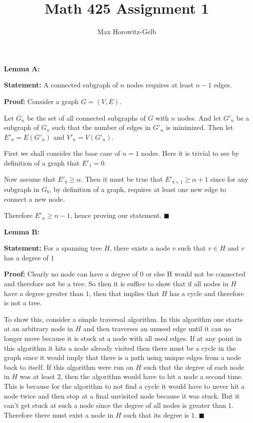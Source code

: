 \documentclass{article}
\title{Math 425 Assignment 1}
\author{Max Horowitz-Gelb}
\date{}
\newcommand*{\QEDA}{\hfill\ensuremath{\blacksquare}}%
\begin{document}
\maketitle
\section{}
\section{}
\textbf{Lemma A:}

\textbf{Statement:} A connected subgraph of $n$ nodes requires at least $n-1$ edges.

\textbf{Proof:} Consider a graph $G = (V,E)$. 

Let $G_n$ be the set of all connected subgraphs of $G$ with $n$ nodes. And let $G'_n$ be a subgraph of $G_n$ such that the number of edges in $G'_n$ is minimized. Then let $E'_n = E(G'_n)$ and $V'_n = V(G'_n)$.

First we shall consider the base case of $n = 1$ nodes. Here it is trivial to see by definition of a graph that $E'_1 = 0$. 

Now assume that $E'_b \geq \alpha$. Then it must be true that $E'_{b+1} \geq \alpha + 1$ since for any subgraph in $G_b$, by definition of a graph, requires at least one new edge to connect a new node.

Therefore $E'_n \geq n-1$, hence proving our statement. 
\QEDA

\textbf{Lemma B:}

\textbf{Statement:}
For a spanning tree $H$, there exists a node $v$ such that $v \in H$ and $v$ has a degree of $1$

\textbf{Proof:} Clearly no node can have a degree of $0$ or else H would not be connected and therefore not be a tree. So then it is suffice to show that if all nodes in $H$ have a degree greater than $1$, then that implies that $H$ has a cycle and therefore is not a tree. 

To show this, consider a simple traversal algorithm. In this algorithm one starts at an arbitrary node in $H$ and then traverses an unused edge until it can no longer move because it is stuck at a node with all used edges. If at any point in this algorithm it hits a node already visited then there must be a cycle in the graph since it would imply that there is a path using unique edges from a node back to itself. If this algorithm were run on $H$ such that the degree of each node in $H$ was at least $2$, then the algorithm would have to hit a node a second time. This is because for the algorithm to not find a cycle it would have to never hit a node twice and then stop at a final unvisited node because it was stuck. But it can't get stuck at such a node since the degree of all nodes is greater than $1$. Therefore there must exist a node in $H$ such that its degree is $1$.
\QEDA
\end{document}
